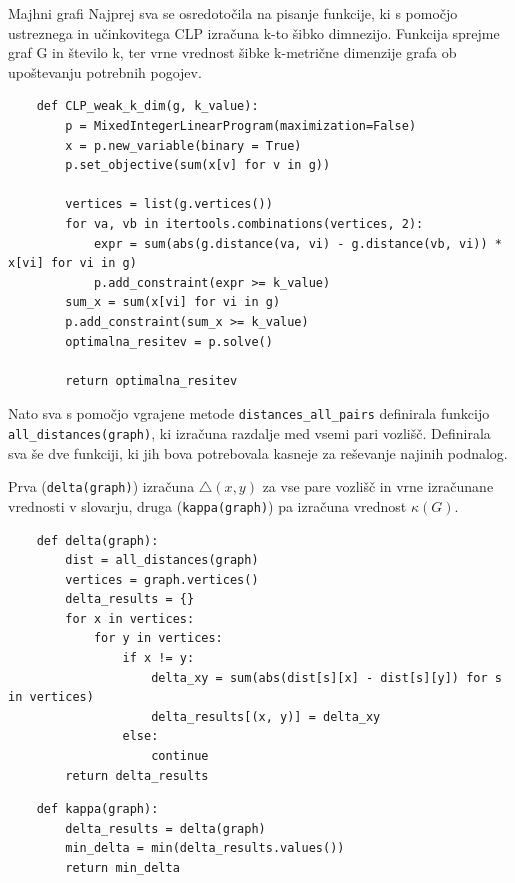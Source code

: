 \documentclass[12pt,a4paper]{amsart}
\makeatletter
\renewcommand\section{\@startsection{section}{1}%
  \z@{.5\linespacing\@plus.7\linespacing}{.5\linespacing}%
  {\normalfont\scshape\large\centering}}
\theoremstyle{plain} %
\makeatother
\begin{document}
\section{Majhni grafi}
Najprej sva se osredotočila na pisanje funkcije, ki s pomočjo ustreznega in učinkovitega CLP izračuna
k-to šibko dimnezijo. Funkcija sprejme graf G in število k, ter vrne vrednost šibke k-metrične dimenzije grafa
ob upoštevanju potrebnih pogojev.
\bigskip 
\begin{small}
    \begin{lstlisting}
    def CLP_weak_k_dim(g, k_value):
        p = MixedIntegerLinearProgram(maximization=False)
        x = p.new_variable(binary = True)
        p.set_objective(sum(x[v] for v in g))

        vertices = list(g.vertices())
        for va, vb in itertools.combinations(vertices, 2):
            expr = sum(abs(g.distance(va, vi) - g.distance(vb, vi)) * x[vi] for vi in g)
            p.add_constraint(expr >= k_value)
        sum_x = sum(x[vi] for vi in g)
        p.add_constraint(sum_x >= k_value)
        optimalna_resitev = p.solve()

        return optimalna_resitev
    \end{lstlisting}
\end{small}
\bigskip

Nato sva s pomočjo vgrajene metode \verb|distances_all_pairs| definirala funkcijo \verb|all_distances(graph)|, ki izračuna 
razdalje med vsemi pari vozlišč. 
Definirala sva še dve funkciji, ki jih bova potrebovala kasneje za reševanje najinih podnalog. 

Prva (\verb|delta(graph)|) izračuna $\triangle(x,y)$ za vse pare vozlišč in vrne izračunane vrednosti v slovarju,
druga (\verb|kappa(graph)|) pa izračuna vrednost $\kappa(G)$.

\begin{lstlisting}
    def delta(graph):
        dist = all_distances(graph)
        vertices = graph.vertices()
        delta_results = {}
        for x in vertices:
            for y in vertices:
                if x != y:
                    delta_xy = sum(abs(dist[s][x] - dist[s][y]) for s in vertices)
                    delta_results[(x, y)] = delta_xy
                else:
                    continue
        return delta_results
\end{lstlisting}

\begin{lstlisting}
    def kappa(graph):
        delta_results = delta(graph)
        min_delta = min(delta_results.values())
        return min_delta
\end{lstlisting}
\bigskip
\end{document}
